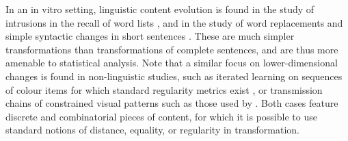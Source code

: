 \documentclass[a4paper,fleqn]{cas-dc}
\begin{document}
In an in vitro setting, linguistic content evolution is found in the study of intrusions in the recall of word lists \citep[see][for a review]{zaromb_temporal_2006}, and in the study of word replacements and simple syntactic changes in short sentences \citep{potter_regeneration_1990,lombardi_regeneration_1992}.
These are much simpler transformations than transformations of complete sentences, and are thus more amenable to statistical analysis. Note that a similar focus on lower-dimensional changes is found in non-linguistic studies, such as iterated learning on sequences of colour items for which standard regularity metrics exist \citep{cornish_systems_2013}, or transmission chains of constrained visual patterns such as those used by \citet{claidiere_cultural_2014}. Both cases feature discrete and combinatorial pieces of content, for which it is possible to use standard notions of distance, equality, or regularity in transformation.



\end{document}
